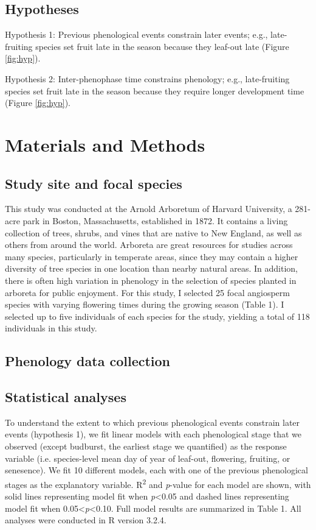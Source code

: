 \documentclass{article}
\begin{document}
\subsection* {Hypotheses}
\par Hypothesis 1: Previous phenological events constrain later events; e.g., late-fruiting species set fruit late in the season because they leaf-out late  (Figure \ref{fig:hyp}).
\par Hypothesis 2: Inter-phenophase time  constrains phenology; e.g., late-fruiting species set fruit late in the season because they require longer development time (Figure \ref{fig:hyp}).
\section* {Materials and Methods}
\subsection*{Study site and focal species}
This study was conducted at the Arnold Arboretum of Harvard University, a 281-acre park in Boston, Massachusetts, established in 1872. It contains a living collection of trees, shrubs, and vines that are native to New England, as well as others from around the world. Arboreta are great resources for studies across many species, particularly in temperate areas, since they may contain a higher diversity of tree species in one location than nearby natural areas. In addition, there is often high variation in phenology in the selection of species planted in arboreta for public enjoyment. For this study, I selected 25 focal angiosperm species with varying flowering times during the growing season (Table 1). I selected up to five individuals of each species for the study, yielding a total of 118 individuals in this study.

\subsection*{Phenology data collection}

\subsection*{Statistical analyses}
To understand the extent to which previous phenological events constrain later events (hypothesis 1), we fit linear models with each phenological stage that we observed (except budburst, the earliest stage we quantified) as the response variable (i.e. species-level mean day of year of leaf-out, flowering, fruiting, or senesence).  We fit 10 different models, each with one of the previous phenological stages as the explanatory variable. R\textsuperscript{2} and \textit{p}-value for each model are shown, with solid lines representing model fit when \textit{p}<0.05 and dashed lines representing model fit when 0.05<\textit{p}<0.10. Full model results are summarized in Table 1. All analyses were conducted in R version 3.2.4.
\end{document}
